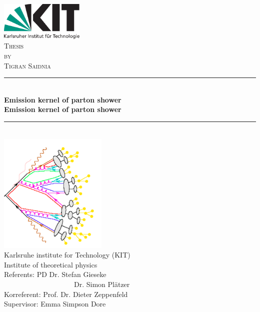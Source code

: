 \begin{titlepage}

\begin{center}


\includegraphics[width=0.3\textwidth]{images/Intro/kitlogo_de_rgb}\\[1cm]    

\textsc{\LARGE Thesis}\\[0.5cm]
\textsc{\Large by}\\[0.5cm]
\textsc{\Large Tigran Saidnia}\\[1.5cm]


\newcommand{\HRule}{\rule{\linewidth}{0.5mm}}
\HRule \\[0.8mm]
{\textbf{\Large \bfseries Emission kernel of parton shower}}\\[0.8mm]

{\textbf{\bfseries Emission kernel of parton shower}}\\[0.8mm]

\HRule \\[1cm]
\includegraphics[scale=0.7]{images/Intro/footPicture.PNG}\\[1cm]   
\Large Karlsruhe institute for Technology (KIT)\\[1.5mm]
\Large Institute of theoretical physics\\[1.5cm]
\Large Referents: PD Dr. Stefan Gieseke \\
\Large ~~~~~~~~~~~~~~~~~~~~Dr. Simon Plätzer\\
\Large Korreferent: Prof. Dr. Dieter Zeppenfeld\\

\Large Supervisor: Emma Simpson Dore\\

\vfill


\end{center}

\end{titlepage}